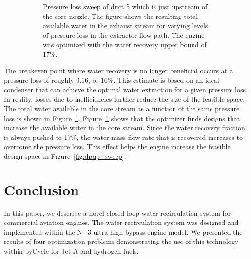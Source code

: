 \documentclass[conf]{new-aiaa}
\begin{document}
\begin{figure}[hbt!]
\begin{subfigure}[t]{0.49\textwidth}
        \caption{
            Pressure loss sweep of duct 5 which is just upstream of the core nozzle.
            The figure shows the resulting total available water in the exhaust stream for varying levels of pressure loss in the extractor flow path.
            The engine was optimized with the water recovery upper bound of 17\%.
        }
        \label{fig:dpqp_wdot}
    \end{subfigure}
    \caption{}
    \label{fig:dpqp_study}
\end{figure}
The breakeven point where water recovery is no longer beneficial occurs at a pressure loss of roughly 0.16, or 16\%.
This estimate is based on an ideal condenser that can achieve the optimal water extraction for a given pressure loss.
In reality, losses due to inefficiencies further reduce the size of the feasible space.
The total water available in the core stream as a function of the same pressure loss is shown in Figure~\ref{fig:dpqp_wdot}.
Figure~\ref{fig:dpqp_wdot} shows that the optimizer finds designs that increase the available water in the core stream.
Since the water recovery fraction is always pushed to 17\%, the water mass flow rate that is recovered increases to overcome the pressure loss.
This effect helps the engine increase the feasible design space in Figure~\ref{fig:dpqp_sweep}.


\section{Conclusion}
\label{sec:conc}
In this paper, we describe a novel closed-loop water recirculation system for commercial aviation engines.
The water recirculation system was designed and implemented within the N+3 ultra-high bypass engine model.
We presented the results of four optimization problems demonstrating the use of this technology within pyCycle for Jet-A and hydrogen fuels.
\end{document}
